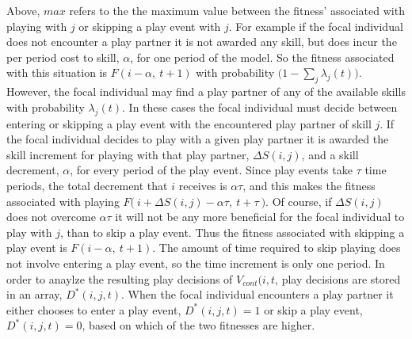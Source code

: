 \documentclass[12pt, letterpaper, fleqn]{article}
\begin{document}
      Above, $max$ refers to the the maximum value between the fitness' associated with playing with $j$ or skipping a play event with $j$.
      For example if the focal individual does not encounter a play partner it is not awarded any skill, but does incur the per period cost to skill, $\alpha$, for one period of the model. 
      So the fitness associated with this situation is $F(i-\alpha,~t+1)$ with probability $\bigl(1-\sum_j \lambda_{j}(t) \bigr)$.     %
      However, the focal individual may find a play partner of any of the available skills with probability $\lambda_j(t)$.  
      In these cases the focal individual must decide between entering or skipping a play event with the encountered play partner of skill $j$. 
      If the focal individual decides to play with a given play partner it is awarded the skill increment for playing with that play partner, $\Delta S(i,j)$, and a skill decrement, $\alpha$, for every period of the play event.
      Since play events take $\tau$ time periods, the total decrement that $i$ receives is $\alpha \tau$, and this makes the fitness associated with playing $F\bigl(~ i + \Delta S(i,j) - \alpha \tau,~t+\tau ~\bigr)$.
      Of course, if $\Delta S(i,j)$ does not overcome $\alpha \tau$ it will not be any more beneficial for the focal individual to play with $j$, than to skip a play event.
      Thus the fitness associated with skipping a play event is $F(i-\alpha,~t+1)$.
      The amount of time required to skip playing does not involve entering a play event, so the time increment is only one period. %
      In order to anaylze the resulting play decisions of $V_{cont}(i,t$, play decisions are stored in an array, $D^*(i,j,t)$.
      When the focal individual encounters a play partner it either chooses to enter a play event, $D^*(i,j,t)=1$  or skip a play event, $D^*(i,j,t)=0$, based on which of the two fitnesses are higher. 
\end{document}
